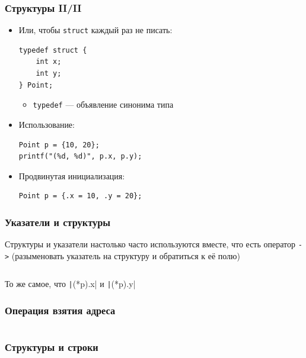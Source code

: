 \documentclass[aspectratio=169]{beamer}
\begin{document}
\begin{frame}[fragile]
    \frametitle{Структуры II/II}
    \begin{itemize}
        \item Или, чтобы \texttt{struct} каждый раз не писать:
              \begin{verbatim}
typedef struct {
    int x;
    int y;
} Point;
            \end{verbatim}
              \begin{itemize}
                  \item \texttt{typedef} --- объявление синонима типа
              \end{itemize}
        \item Использование:
              \begin{verbatim}
Point p = {10, 20};
printf("(%d, %d)", p.x, p.y);
            \end{verbatim}
        \item Продвинутая инициализация:
              \begin{verbatim}
Point p = {.x = 10, .y = 20};
            \end{verbatim}
    \end{itemize}
\end{frame}

\begin{frame}
    \frametitle{Указатели и структуры}
    Структуры и указатели настолько часто используются вместе, что есть оператор \texttt{->} (разыменовать указатель на структуру и обратиться к её полю)
    \begin{footnotesize}
        \inputminted[extrakeywordstype={Point}, firstline=8, lastline=20]{c}{structPointer.c}
    \end{footnotesize}
    То же самое, что \texttt|(*p).x| и \texttt|(*p).y|
\end{frame}

\begin{frame}[fragile]
    \frametitle{Операция взятия адреса}
    \inputminted[extrakeywordstype={Point}, firstline=8, lastline=17]{c}{structRef.c}
\end{frame}

\begin{frame}[fragile]
    \frametitle{Структуры и строки}
    \begin{footnotesize}
        \inputminted[extrakeywordstype={PhoneBookEntry}, firstline=4, lastline=22]{c}{structStr.c}
    \end{footnotesize}
\end{frame}
\end{document}
